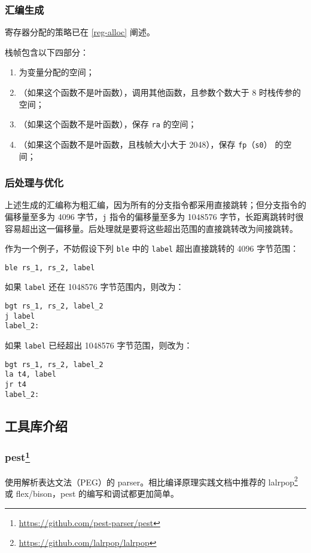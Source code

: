 \subsubsection{汇编生成}
寄存器分配的策略已在 \ref{reg-alloc} 阐述。

栈帧包含以下四部分：
\begin{enumerate}
    \item 为变量分配的空间；
    \item （如果这个函数不是叶函数），调用其他函数，且参数个数大于 8 时栈传参的空间；
    \item （如果这个函数不是叶函数），保存 \texttt{ra} 的空间；
    \item （如果这个函数不是叶函数，且栈帧大小大于 2048），保存 \texttt{fp}（\texttt{s0}） 的空间；
\end{enumerate}
\subsubsection{后处理与优化}
上述生成的汇编称为粗汇编，因为所有的分支指令都采用直接跳转；但分支指令的偏移量至多为 4096 字节，\texttt{j} 指令的偏移量至多为 1048576 字节，长距离跳转时很容易超出这一偏移量。后处理就是要将这些超出范围的直接跳转改为间接跳转。

作为一个例子，不妨假设下列 \texttt{ble} 中的 \texttt{label} 超出直接跳转的 4096 字节范围：
\begin{verbatim}
ble rs_1, rs_2, label
\end{verbatim}
如果 \texttt{label} 还在 1048576 字节范围内，则改为：
\begin{verbatim}
bgt rs_1, rs_2, label_2
j label
label_2:
\end{verbatim}
如果 \texttt{label} 已经超出 1048576 字节范围，则改为：
\begin{verbatim}
bgt rs_1, rs_2, label_2
la t4, label
jr t4
label_2:
\end{verbatim}
\subsection{工具库介绍}
\subsubsection[pest]{pest\footnote{\url{https://github.com/pest-parser/pest}}}
使用解析表达文法（PEG）的 parser。相比编译原理实践文档中推荐的 lalrpop\footnote{\url{https://github.com/lalrpop/lalrpop}} 或 flex/bison，pest 的编写和调试都更加简单。
